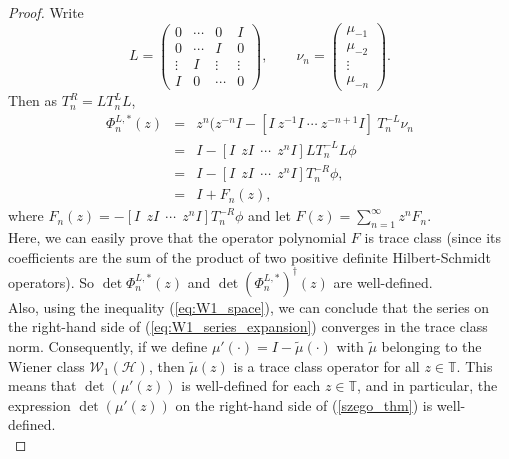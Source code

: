 \documentclass[11pt]{article}
\begin{document}
\begin{proof}
 Write
    \[ 
    L =
    \begin{pmatrix}
    0 & \cdots & 0 & I\\
    0 &  \cdots & I & 0\\
    \vdots & I & \vdots & \vdots\\
    I & 0 & \cdots & 0
    \end{pmatrix},
    \qquad
    \nu_{n}=
    \begin{pmatrix}
    \mu_{-1}\\
    \mu_{-2}\\
    \vdots \\
    \mu_{-n}
    \end{pmatrix}.
    \]
    Then as $T^{R}_{n} = L T^{L}_{n} L$,
    \begin{eqnarray*}
    \Phi_{n}^{L,*} (z)
    &=& z^{n}(z^{-n}I-[I \ z^{-1}I \ \cdots \ z^{-n+1}I] \ T^{-L}_{n}{\nu}_{n}\\
    &=& I - [I~~zI~~ \cdots ~~ z^{n}I]L T^{-L}_{n} L \phi\\
    &=& I - [I~~zI~~ \cdots ~~ z^{n}I]T^{-R}_{n} \phi,\\
    &=& I + F_n(z),
    \end{eqnarray*}
    where $F_n(z) =-[I~~zI~~ \cdots ~~ z^{n}I]T^{-R}_{n} \phi$ and let $F(z) = \sum_{n=1}^{\infty}z^{n}F_{n}$.  \\
    
    Here, we can easily prove that the operator polynomial $F$ is trace class (since its coefficients are the sum of the product of two positive definite Hilbert-Schmidt operators). So $\det \Phi_{n}^{L,*} (z)$ and $\det (\Phi_{n}^{L,*})^{\dag} (z)$ are well-defined.\\
    
    Also, using the inequality (\ref{eq:W1_space}), we can conclude that the series on the right-hand side of (\ref{eq:W1_series_expansion}) converges in the trace class norm. Consequently, if we define $\mu'(\cdot) = I - \tilde{\mu}(\cdot)$ with $\tilde{\mu}$ belonging to the Wiener class $\mathcal{W}_{1}(\mathcal{H})$, then $\tilde{\mu}(z)$ is a trace class operator for all $z \in \mathbb{T}$. This means that $\det (\mu'(z))$ is well-defined for each $z \in \mathbb{T}$, and in particular, the expression $\det (\mu'(z))$ on the right-hand side of (\ref{szego_thm}) is well-defined.\\
    

\end{proof}
\end{document}
